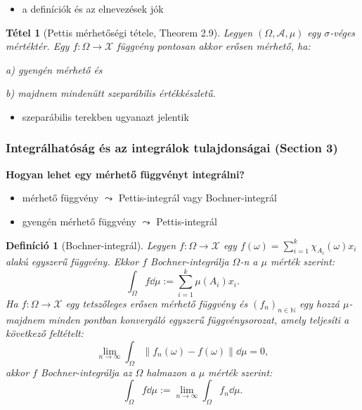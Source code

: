 \documentclass{beamer} %
\newtheorem{theo}[lem]{Tétel}
\newtheorem{defi}[lem]{Definíció}
\begin{document}
\begin{frame}
\justifying
\begin{itemize}
\item a definíciók és az elnevezések jók
\end{itemize}
\pause 
\begin{theo}[Pettis mérhetőségi tétele, Theorem 2.9] Legyen $(\Omega,\mathcal{A},\mu)$ egy $\sigma$-véges mértéktér. Egy $f \colon \Omega \to \mathcal{X}$ függvény pontosan akkor erősen mérhető, ha:

a) gyengén mérhető és

b) majdnem mindenütt szeparábilis értékkészletű.
\end{theo}
\begin{itemize}
\pause \item szeparábilis terekben ugyanazt jelentik
\end{itemize}
\end{frame}

\begin{frame}
\frametitle{Integrálhatóság és az integrálok tulajdonságai (Section 3)}
\textbf{Hogyan lehet egy mérhető függvényt integrálni?}
\begin{itemize}
\pause \item mérhető függvény $\leadsto$ Pettis-integrál vagy Bochner-integrál
\pause \item gyengén mérhető függvény $\leadsto$ Pettis-integrál
\end{itemize}
\end{frame}

\begin{frame}
\justifying
\begin{defi}[Bochner-integrál] Legyen $f \colon \Omega \to \mathcal{X}$ egy $f(\omega) = \sum^{k}_{i=1} \chi_{A_i}(\omega) x_i$ alakú egyszerű függvény. Ekkor $f$ Bochner-integrálja $\Omega$-n a $\mu$ mérték szerint:
$$\int_{\Omega} f \dd{\mu} := \sum^{k}_{i=1} \mu(A_i) x_i.$$
\pause Ha $f \colon \Omega \to \mathcal{X}$ egy tetszőleges erősen mérhető függvény és $(f_n)_{n \in \mathbb{N}}$ egy hozzá $\mu$-majdnem minden pontban konvergáló egyszerű függvénysorozat, amely teljesíti a következő feltételt:
$$\lim_{n \to \infty}\int_{\Omega} \| f_n(\omega) - f(\omega) \| \dd{\mu} = 0,$$
\pause akkor $f$ Bochner-integrálja az $\Omega$ halmazon a $\mu$ mérték szerint:
$$\int_{\Omega} f \dd{\mu} := \lim_{n \to \infty} \int_{\Omega} f_n \dd{\mu}.$$
\end{defi}
\end{frame}
\end{document}
